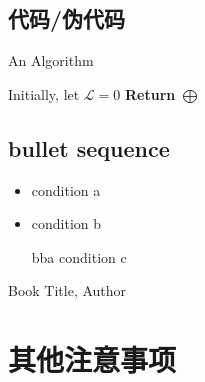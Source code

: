 \documentclass{article}
\begin{document}
\begin{spacing}{1.4}
\subsection{代码/伪代码}

\begin{algorithm}[H]
\caption{An Algorithm}
\label{algo2}
Initially, let $\mathcal{L} = 0$\;
{\bf Return} $\bigoplus$\;
\end{algorithm}

\subsection{bullet sequence}
\begin{itemize}
\item condition a
\item condition b
\item[bba] condition c
\end{itemize}

\renewcommand\refname{\large 参考文献}
\begin{thebibliography}{}  
 Book Title, Author  
\end{thebibliography}

\section{其他注意事项}
\end{spacing}
\end{document}
